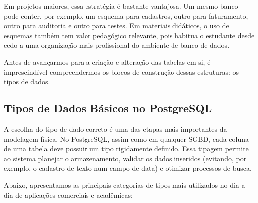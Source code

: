 Em projetos maiores, essa estratégia é bastante vantajosa. Um mesmo banco pode conter, por exemplo, um esquema para cadastros, outro para faturamento, outro para auditoria e outro para testes. Em materiais didáticos, o uso de esquemas também tem valor pedagógico relevante, pois habitua o estudante desde cedo a uma organização mais profissional do ambiente de banco de dados.

Antes de avançarmos para a criação e alteração das tabelas em si, é imprescindível compreendermos os blocos de construção dessas estruturas: os tipos de dados.

\subsection{Tipos de Dados Básicos no PostgreSQL}
A escolha do tipo de dado correto é uma das etapas mais importantes da modelagem física. No PostgreSQL, assim como em qualquer SGBD, cada coluna de uma tabela deve possuir um tipo rigidamente definido. Essa tipagem permite ao sistema planejar o armazenamento, validar os dados inseridos (evitando, por exemplo, o cadastro de texto num campo de data) e otimizar processos de busca.

Abaixo, apresentamos as principais categorias de tipos mais utilizados no dia a dia de aplicações comerciais e acadêmicas:

